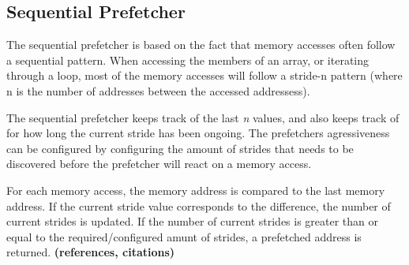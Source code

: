 \subsection{Sequential Prefetcher}
\label{sec:sequentialPrefetcher}
The sequential prefetcher is based on the fact that memory accesses
often follow a sequential pattern. When accessing the members of an
array, or iterating through a loop, most of the memory accesses will
follow a stride-n pattern (where n is the number of addresses between
the accessed addressess).

The sequential prefetcher keeps track of the last \emph{n} values, and
also keeps track of for how long the current stride has been
ongoing. The prefetchers agressiveness can be configured by
configuring the amount of strides that needs to be discovered before
the prefetcher will react on a memory access.

For each memory access, the memory address is compared to the last
memory address. If the current stride value corresponds to the
difference, the number of current strides is updated. If the number of
current strides is greater than or equal to the required/configured
amunt of strides, a prefetched address is returned.  {\bf (references,
  citations)}